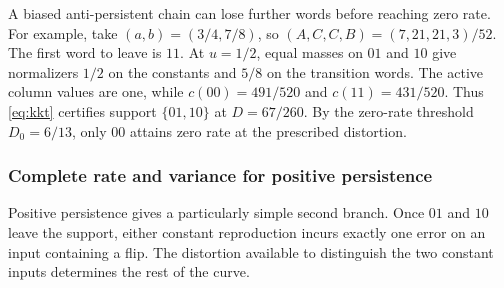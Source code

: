 \documentclass[11pt,letterpaper]{article}
\theoremstyle{definition}
\begin{document}
A biased anti-persistent chain can lose further words before reaching zero rate. For example, take $(a,b)=(3/4,7/8)$, so $(A,C,C,B)=(7,21,21,3)/52$. The first word to leave is $11$. At $u=1/2$, equal masses on $01$ and $10$ give normalizers $1/2$ on the constants and $5/8$ on the transition words. The active column values are one, while $c(00)=491/520$ and $c(11)=431/520$. Thus \eqref{eq:kkt} certifies support $\{01,10\}$ at $D=67/260$. By the zero-rate threshold $D_0=6/13$, only $00$ attains zero rate at the prescribed distortion.

\subsubsection{Complete rate and variance for positive persistence}
Positive persistence gives a particularly simple second branch. Once $01$ and $10$ leave the support, either constant reproduction incurs exactly one error on an input containing a flip. The distortion available to distinguish the two constant inputs determines the rest of the curve.
\end{document}
